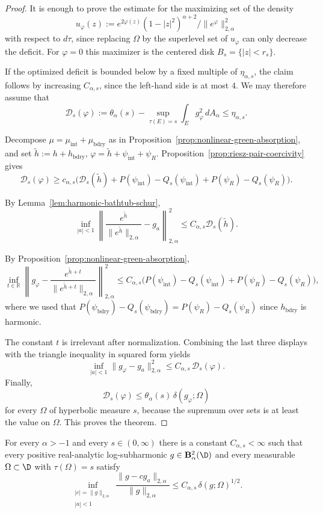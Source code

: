 \begin{proof}
It is enough to prove the estimate for the maximizing set of the density
\[
u_\varphi(z):=
e^{2\varphi(z)}(1-|z|^2)^{\alpha+2}
\Big/\|e^\varphi\|_{2,\alpha}^2
\]
with respect to $d\tau$, since replacing $\Omega$ by the superlevel set of
$u_\varphi$ can only decrease the deficit. For $\varphi=0$ this maximizer is
the centered disk $B_s=\{|z|<r_s\}$.

If the optimized deficit is bounded below by a fixed multiple of
$\eta_{\alpha,s}$, the claim follows by increasing $C_{\alpha,s}$, since the
left-hand side is at most $4$. We may therefore assume that
\[
\mathcal D_s(\varphi)
:=
\theta_\alpha(s)
-
\sup_{\tau(E)=s}\int_E g_\varphi^2\,dA_\alpha
\le\eta_{\alpha,s}.
\]

Decompose $\mu=\mu_{\mathrm{int}}+\mu_{\mathrm{bdry}}$ as in
Proposition~\ref{prop:nonlinear-green-absorption}, and set
$\widetilde h:=h+h_{\mathrm{bdry}}$,
$\varphi=\widetilde h+\psi_{\mathrm{int}}+\psi_R$.
Proposition~\ref{prop:riesz-pair-coercivity} gives
\[
\mathcal D_s(\varphi)
\ge
c_{\alpha,s}\bigl(\mathcal D_s(\widetilde h)
+P(\psi_{\mathrm{int}})-Q_s(\psi_{\mathrm{int}})
+P(\psi_R)-Q_s(\psi_R)\bigr).
\]

By Lemma~\ref{lem:harmonic-bathtub-schur},
\[
\inf_{|a|<1}
\left\|
\frac{e^{\widetilde h}}{\|e^{\widetilde h}\|_{2,\alpha}}-g_a
\right\|_{2,\alpha}^2
\le
C_{\alpha,s}\mathcal D_s(\widetilde h).
\]

By Proposition~\ref{prop:nonlinear-green-absorption},
\[
\inf_{t\in\mathbb R}
\left\|
g_\varphi-
\frac{e^{\widetilde h+t}}{\|e^{\widetilde h+t}\|_{2,\alpha}}
\right\|_{2,\alpha}^2
\le
C_{\alpha,s}\bigl(P(\psi_{\mathrm{int}})-Q_s(\psi_{\mathrm{int}})
+P(\psi_R)-Q_s(\psi_R)\bigr),
\]
where we used that $P(\psi_{\mathrm{bdry}})-Q_s(\psi_{\mathrm{bdry}})
=P(\psi_R)-Q_s(\psi_R)$ since $h_{\mathrm{bdry}}$ is harmonic.

The constant $t$ is irrelevant after normalization. Combining the last three
displays with the triangle inequality in squared form yields
\[
\inf_{|a|<1}\|g_\varphi-g_a\|_{2,\alpha}^2
\le
C_{\alpha,s}\,\mathcal D_s(\varphi).
\]
Finally,
\[
\mathcal D_s(\varphi)
\le
\theta_\alpha(s)\,\delta(g_\varphi;\Omega)
\]
for every $\Omega$ of hyperbolic measure $s$, because the supremum over sets is
at least the value on $\Omega$. This proves the theorem.
\end{proof}


\begin{numthm}\label{thm:global-half-from-green-absorption}
For every $\alpha>-1$ and every $s\in(0,\infty)$ there is a constant
$C_{\alpha,s}<\infty$ such that every positive real-analytic log-subharmonic
$g\in\mathbf B_\alpha^2(\D)$ and every measurable
$\Omega\subset\D$ with $\tau(\Omega)=s$ satisfy
\[
\inf_{\substack{|c|=\|g\|_{2,\alpha}\\ |a|<1}}
\frac{\|g-cg_a\|_{2,\alpha}}{\|g\|_{2,\alpha}}
\le
C_{\alpha,s}\,\delta(g;\Omega)^{1/2}.
\]
\end{numthm}

